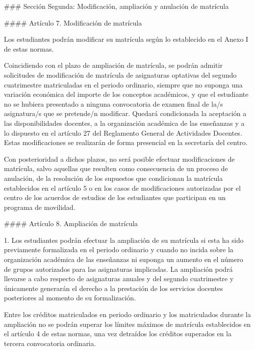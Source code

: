 \documentclass{article}
\begin{document}
\begin{itemize}
\begin{itemize}
\begin{scriptsize}
                  \#\#\# Sección Segunda: Modificación, ampliación y anulación de matrícula

                  \#\#\#\# Artículo 7. Modificación de matrícula

                  Los estudiantes podrán modificar su matrícula según lo establecido en el Anexo I de estas normas.

                  Coincidiendo con el plazo de ampliación de matrícula, se podrán admitir solicitudes de modificación de matrícula de asignaturas optativas del segundo cuatrimestre matriculadas en el periodo ordinario, siempre que no suponga una variación económica del importe de los conceptos académicos, y que el estudiante no se hubiera presentado a ninguna convocatoria de examen final de la/s asignatura/s que se pretende/n modificar. Quedará condicionada la aceptación a las disponibilidades docentes, a la organización académica de las enseñanzas y a lo dispuesto en el artículo 27 del Reglamento General de Actividades Docentes. Estas modificaciones se realizarán de forma presencial en la secretaría del centro.

                  Con posterioridad a dichos plazos, no será posible efectuar modificaciones de matrícula, salvo aquellas que resulten como consecuencia de un proceso de anulación, de la resolución de los supuestos que condicionan la matrícula establecidos en el artículo 5 o en los casos de modificaciones autorizadas por el centro de los acuerdos de estudios de los estudiantes que participan en un programa de movilidad.

                  \#\#\#\# Artículo 8. Ampliación de matrícula

                  1. Los estudiantes podrán efectuar la ampliación de su matrícula si esta ha sido previamente formalizada en el periodo ordinario y cuando no incida sobre la organización académica de las enseñanzas ni suponga un aumento en el número de grupos autorizados para las asignaturas implicadas. La ampliación podrá llevarse a cabo respecto de asignaturas anuales y del segundo cuatrimestre y únicamente generarán el derecho a la prestación de los servicios docentes posteriores al momento de su formalización.

                  Entre los créditos matriculados en periodo ordinario y los matriculados durante la ampliación no se podrán superar los límites máximos de matrícula establecidos en el artículo 4 de estas normas, una vez detraídos los créditos superados en la tercera convocatoria ordinaria.


\end{scriptsize}
\end{itemize}
\end{itemize}
\end{document}
